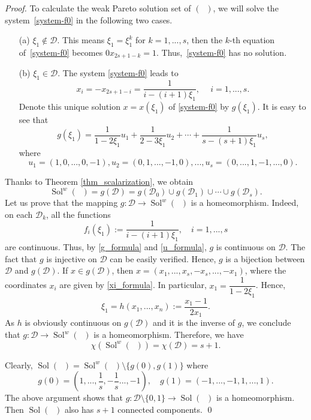 \documentclass[smallextended,envcountsect]{svjour3}       %
\DeclareMathOperator{\Sol}{Sol}
\DeclareMathOperator{\Pone}{P_0}
\begin{document}
\begin{proof}
To calculate the weak Pareto solution set of $(\Pone)$, we will solve the system~\eqref{system-f0} in the following two cases. 
\begin{itemize}
	\item[(a)] $\xi_1\notin \mathcal{D}$. This means $\xi_1=\xi_1^k$ for $k=1,...,s$, then the $k$-th equation of~\eqref{system-f0} becomes $0x_{2s+1-k}=1$. Thus,~\eqref{system-f0} has no solution.
	\item[(b)] $\xi_1\in \mathcal{D}$. The system \eqref{system-f0} leads to 
	\begin{equation}\label{xi_formula}x_i=-x_{2s+1-i}=\dfrac{1}{i-(i+1)\xi_1},\quad \ i=1,...,s.\end{equation}
Denote this unique solution $x=x(\xi_1)$ of \eqref{system-f0} by $g(\xi_1)$. It is easy to see that
	\begin{equation}\label{g_formula}
	g(\xi_1)=\frac{1}{1-2\xi_1}u_1+\frac{1}{2-3\xi_1}u_2+\cdots+\frac{1}{s-(s+1)\xi_1}u_s,
	\end{equation}
where 
\begin{equation}\label{u_formula}
u_1=(1,0,...,0,-1), u_2=(0,1,...,-1,0),..., u_s=(0,...,1,-1,...,0).
\end{equation}
\end{itemize}
Thanks to Theorem \ref{thm_scalarization}, we obtain
$$\Sol^w(\Pone)=g(\mathcal{D})=g(\mathcal{D}_0)\cup g(\mathcal{D}_1)\cup\cdots\cup g(\mathcal{D}_s).$$ Let us prove that the mapping $g:\mathcal{D}\to \Sol^w(\Pone)$ is a  homeomorphism. Indeed, on each $\mathcal{D}_k$, all the functions $$f_i(\xi_1):=\frac{1}{i-(i+1)\xi_1},\quad i=1,...,s$$
 are continuous. Thus, by \eqref{g_formula} and \eqref{u_formula}, $g$ is continuous on $\mathcal{D}$. The fact that $g$ is injective on  $\mathcal{D}$ can be easily verified. Hence, $g$ is a bijection between $\mathcal{D}$ and $g(\mathcal{D})$. 
If $x\in g(\mathcal{D})$, then $x=(x_1,...,x_s,-x_s,...,-x_1)$, where the coordinates $x_i$ are given by \eqref{xi_formula}. In particular, $x_1=\dfrac{1}{1-2\xi_1}$. Hence,
	 $$\xi_1=h(x_1,...,x_n):=\frac{x_1-1}{2x_1}.$$ As $h$ is obviously continuous on $g(\mathcal{D})$ and it is the inverse of $g$, we conclude that $g:\mathcal{D}\to \Sol^w(\Pone)$ is a homeomorphism. Therefore, we have $$\chi(\Sol^w(\Pone))=\chi(\mathcal{D})=s+1.$$
	
Clearly, $\Sol(\Pone)=\Sol^w(\Pone)\setminus\{g(0),g(1)\}$ where  $$g(0)=(1,...,\frac{1}{s},-\frac{1}{s}...,-1),\quad g(1)=(-1,...,-1,1,...,1).$$
The above argument shows that $g:\mathcal{D}\setminus\{0,1\}\to \Sol(\Pone)$ is a homeomorphism. Then $\Sol(\Pone)$ also has $s+1$ connected components. \qed
\end{proof}
\end{document}
